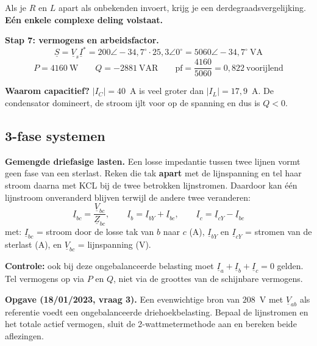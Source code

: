 \documentclass[a4paper,11pt]{article}
\begin{document}
\begin{oefenblok}
    \begin{waarschuwing}
        Als je $R$ en $L$ apart als onbekenden invoert, krijg je een derdegraadsvergelijking.
        \textbf{Eén enkele complexe deling volstaat.}
    \end{waarschuwing}

    \textbf{Stap 7: vermogens en arbeidsfactor.}
    \[\underline{S} = \underline{V}_s\underline{I}^{*} = 200\angle -34{,}7^\circ \cdot 25{,}3\angle 0^\circ
        = 5060\angle -34{,}7^\circ\ \text{VA}\]
    \[P = \boxed{4160\ \text{W}} \qquad Q = \boxed{-2881\ \text{VAR}} \qquad
        \text{pf} = \frac{4160}{5060} = \boxed{0{,}822\ \text{voorijlend}}\]

    \textbf{Waarom capacitief?} $|I_C| = 40$~A is veel groter dan $|I_L| = 17{,}9$~A. De condensator
    domineert, de stroom ijlt voor op de spanning en dus is $Q < 0$.
\end{oefenblok}

\subsection{3-fase systemen}

\textbf{Gemengde driefasige lasten.} Een losse impedantie tussen twee lijnen vormt geen fase
van een sterlast. Reken die tak \textbf{apart} met de lijnspanning en tel haar stroom daarna
met KCL bij de twee betrokken lijnstromen. Daardoor kan één lijnstroom onveranderd blijven terwijl
de andere twee veranderen:
\[
    \underline{I}_{bc}=\frac{\underline{V}_{bc}}{\underline{Z}_{bc}},\qquad
    \underline{I}_b=\underline{I}_{bY}+\underline{I}_{bc},\qquad
    \underline{I}_c=\underline{I}_{cY}-\underline{I}_{bc}
\]
met: $\underline{I}_{bc}$ = stroom door de losse tak van $b$ naar $c$ (A),
$\underline{I}_{bY}$ en $\underline{I}_{cY}$ = stromen van de sterlast (A), en
$\underline{V}_{bc}$ = lijnspanning (V).

\textbf{Controle:} ook bij deze ongebalanceerde belasting moet
$\underline{I}_a+\underline{I}_b+\underline{I}_c=0$ gelden. Tel vermogens op via $P$ en $Q$,
niet via de groottes van de schijnbare vermogens.

\textbf{Opgave (18/01/2023, vraag 3).} Een evenwichtige bron van $208$~V met $\underline{V}_{ab}$
als referentie voedt een ongebalanceerde driehoekbelasting. Bepaal de lijnstromen en het totale
actief vermogen, sluit de 2-wattmetermethode aan en bereken beide aflezingen.
\end{document}
